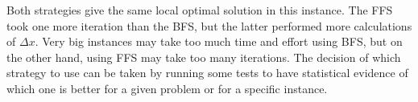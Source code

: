 \documentclass[11pt]{article}
\begin{document}
Both strategies give the same local optimal solution in this instance.
The FFS took one more iteration than the BFS, but the latter performed
more calculations of \(\Delta x\). Very big instances may take too much
time and effort using BFS, but on the other hand, using FFS may take too
many iterations. The decision of which strategy to use can be taken by
running some tests to have statistical evidence of which one is better
for a given problem or for a specific instance.


    
    
    
\end{document}
